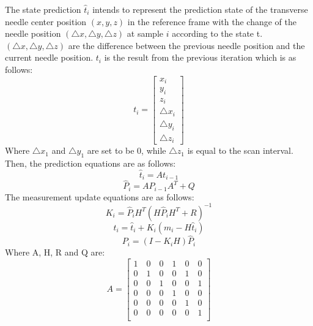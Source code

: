 \documentclass[journal,article,submit,moreauthors,pdftex]{Definitions/mdpi}
\begin{document}
The state prediction ${\hat{t}_i}$ intends to represent the prediction state of the transverse needle center position ${(x, y, z)}$ in the reference frame with the change of the needle position ${(\triangle x,\triangle y,\triangle z)}$ at sample ${i}$ according to the state t. ${(\triangle x,\triangle y,\triangle z)}$ are the difference between the previous needle position and the current needle position. ${t_i}$ is the result from the previous iteration which is as follows:
\begin{equation}
	t_i =
	\begin{bmatrix}
		x_i           \\
		y_i           \\
		z_i           \\
		\triangle x_i \\
		\triangle y_i \\
		\triangle z_i 
	\end{bmatrix}
\end{equation}
Where ${\triangle x_1}$ and ${\triangle y_1}$ are set to be 0, while ${\triangle z_1}$ is equal to the scan interval.
Then, the prediction equations are as follows:
\begin{equation}
	\hat{t}_i= At_{i-1}
\end{equation}
\begin{equation}
	\hat{P}_i=AP_{i-1}A^T+Q
\end{equation}
The measurement update equations are as follows:
\begin{equation}
	K_i=\hat{P}_iH^T(H\hat{P}_iH^T+R)^{-1}
\end{equation}
\begin{equation}
	\label{eq:6}
	t_i=\hat{t}_i+K_i(m_i-H\hat{t}_i)
\end{equation}
\begin{equation}
	P_i=(I- K_iH)\hat{P}_i
\end{equation}
Where A, H, R and Q are:
\begin{equation}
	A =
	\begin{bmatrix}
		1 \quad 0 \quad 0 \quad 1 \quad 0 \quad 0 \\
		0 \quad 1 \quad 0 \quad 0 \quad 1 \quad 0 \\
		0 \quad 0 \quad 1 \quad 0 \quad 0 \quad 1 \\
		0 \quad 0 \quad 0 \quad 1 \quad 0 \quad 0 \\
		0 \quad 0 \quad 0 \quad 0 \quad 1 \quad 0 \\
		0 \quad 0 \quad 0 \quad 0 \quad 0 \quad 1 \\
	\end{bmatrix}
\end{equation}
\end{document}
